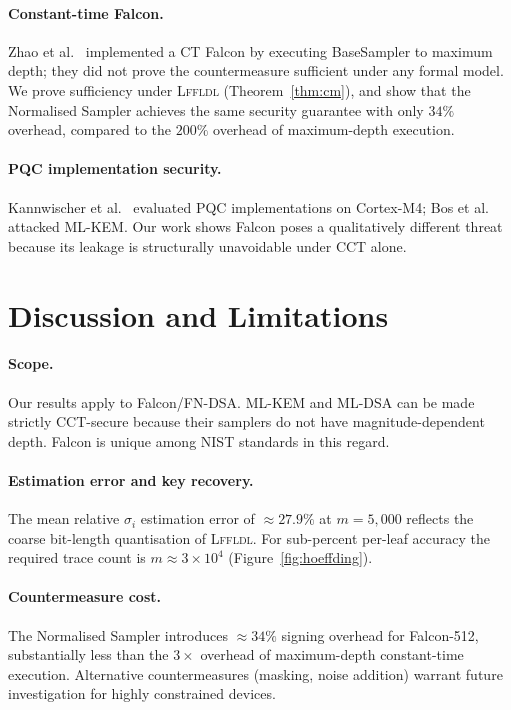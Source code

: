 \documentclass[sigconf,anonymous]{acmart}
\begin{document}
\paragraph{Constant-time Falcon.}
Zhao et al.~\cite{zhao2023ct} implemented a CT Falcon by executing BaseSampler
to maximum depth; they did not prove the countermeasure sufficient under any
formal model.  We prove sufficiency under \textsc{Lffldl} (Theorem~\ref{thm:cm}),
and show that the Normalised Sampler achieves the same security guarantee with
only $34\%$ overhead, compared to the $200\%$ overhead of maximum-depth
execution.

\paragraph{PQC implementation security.}
Kannwischer et al.~\cite{kannwischer2019} evaluated PQC implementations on
Cortex-M4; Bos et al.~\cite{bos2022} attacked ML-KEM.  Our work shows Falcon
poses a qualitatively different threat because its leakage is structurally
unavoidable under CCT alone.

\section{Discussion and Limitations}

\paragraph{Scope.}
Our results apply to Falcon/FN-DSA.  ML-KEM and ML-DSA can be made strictly
CCT-secure because their samplers do not have magnitude-dependent depth.
Falcon is unique among NIST standards in this regard.

\paragraph{Estimation error and key recovery.}
The mean relative $\sigma_i$ estimation error of $\approx27.9\%$ at $m=5{,}000$
reflects the coarse bit-length quantisation of \textsc{Lffldl}.  For sub-percent
per-leaf accuracy the required trace count is $m\approx3\times10^4$
(Figure~\ref{fig:hoeffding}).

\paragraph{Countermeasure cost.}
The Normalised Sampler introduces $\approx34\%$ signing overhead for Falcon-512,
substantially less than the $3\times$ overhead of maximum-depth constant-time
execution.  Alternative countermeasures (masking, noise addition) warrant future
investigation for highly constrained devices.
\end{document}
